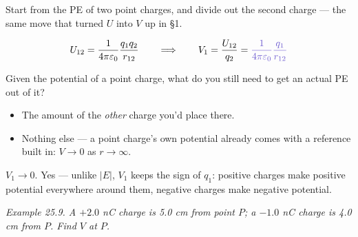 \documentclass[12pt]{article}
\newcommand{\ANS}[1]{\textcolor{accent}{#1}}
\begin{document}

Start from the PE of two point charges, and divide out the second charge
--- the same move that turned $U$ into $V$ up in \S1.

\[
U_{12} = \dfrac{1}{4\pi\varepsilon_0}\dfrac{q_1 q_2}{r_{12}}
\qquad\Longrightarrow\qquad
V_1 = \dfrac{U_{12}}{q_2} = \ANS{\dfrac{1}{4\pi\varepsilon_0}\dfrac{q_1}{r_{12}}}
\]

Given the potential of a point charge, what do you still need to get an
actual PE out of it?

\begin{itemize}[itemsep=6pt,parsep=3pt,topsep=3pt]
\item \ANS{The amount of the \emph{other} charge you'd place there.}
\item \ANS{Nothing else} --- a point charge's own potential already comes
with a reference built in: $V\to0$ as $r\to\infty$.
\end{itemize}


{\small\color{accent} $V_1\to0$. Yes --- unlike $|E|$, $V_1$ keeps the sign
of $q_1$: positive charges make positive potential everywhere around them,
negative charges make negative potential.}


\textit{Example 25.9. A $+2.0$ nC charge is 5.0 cm from point $P$; a
$-1.0$ nC charge is 4.0 cm from $P$. Find $V$ at $P$.}

\begin{center}
\end{center}
\end{document}
